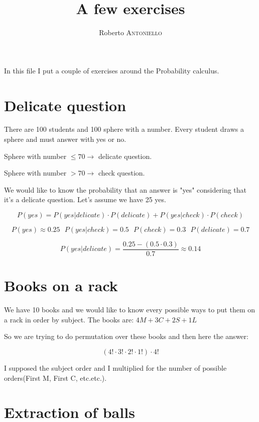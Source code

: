 \documentclass{article}
\title{A few exercises}
\author{Roberto \textsc{Antoniello}}
\begin{document}
\maketitle

\begin{center} In this file I put a couple of exercises around the Probability calculus.\end{center}

\section{Delicate question}

There are 100 students and 100 sphere with a number. Every student draws a sphere and must answer with yes or no.

\bigskip

Sphere with number $\leq 70 \rightarrow$ delicate question.

Sphere with number $> 70 \rightarrow$ check question.

\bigskip

We would like to know the probability that an answer is "yes" considering that it's a delicate question. Let's assume we have 25 yes.

$$P(yes) = P(yes|delicate)\cdot P(delicate) + P(yes| check) \cdot P(check)$$

$$P(yes) \approx 0.25 \ \ \ P(yes|check)  = 0.5 \ \ \ P(check) = 0.3 \ \ \ P(delicate) = 0.7$$

$$P(yes|delicate) = \frac{0.25 - (0.5\cdot 0.3)}{0.7} \approx 0.14$$

\section{Books on a rack}

We have 10 books and we would like to know every possible ways to put them on a rack in order by subject.
The books are: $4M + 3C + 2S + 1L$

\bigskip

So we are trying to do permutation over these books and then here the answer:

$$(4!\cdot3!\cdot2!\cdot1!)\cdot 4!$$

I supposed the subject order and I multiplied for the number of possible orders(First M, First C, etc.etc.).

\section{Extraction of balls}
\end{document}
